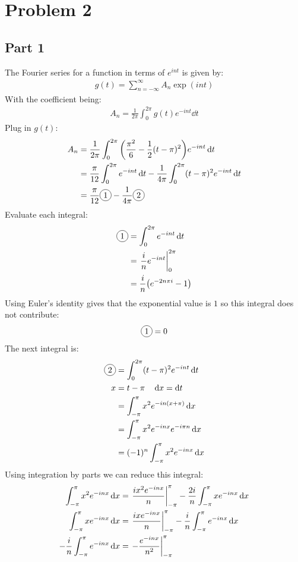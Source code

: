 \documentclass[12pt]{article}
\newcommand*\circled[1]{\tikz[baseline=(char.base)]{
            \node[shape=circle,draw,inner sep=2pt] (char) {#1};}}
\begin{document}
\section*{Problem 2}
\subsection*{Part 1}
The Fourier series for a function in terms of $e^{int}$ is given by:
\begin{align*}
  g(t)=\sum_{n=-\infty}^{\infty}A_n\exp(int)
\end{align*}
With the coefficient being:
\begin{align*}
  A_n=\frac{1}{2\pi}\int_0^{2\pi}g(t)e^{-int}\dd{t}
\end{align*}
Plug in $g(t)$:
\begin{align*}
  A_n&=\frac{1}{2\pi}\int_0^{2\pi}
  \qty(\frac{\pi^2}{6}-\frac12(t-\pi)^2)e^{-int}\dd{t}\\
  &=\frac\pi{12}\int_0^{2\pi}e^{-int}\dd{t}
  -\frac{1}{4\pi}\int_0^{2\pi}(t-\pi)^2e^{-int}\dd{t}\\
  &=\frac{\pi}{12}\circled{1}-\frac{1}{4\pi}\circled{2}
\end{align*}
Evaluate each integral:
\begin{align*}
  \circled{1}&=\int_0^{2\pi}e^{-int}\dd{t}\\
  &=\eval{\frac{i}{n}e^{-int}}_{0}^{2\pi}\\
  &=\frac{i}{n}\qty(e^{-2n\pi i}-1)
\end{align*}
Using Euler's identity gives that the exponential value is $1$ so this integral does not contribute:
\begin{align*}
  \circled{1}=0
\end{align*}
The next integral is:
\begin{align*}
  \circled{2}&=\int_0^{2\pi}(t-\pi)^2e^{-int}\dd{t}\\
  x&=t-\pi \quad \dd{x}=\dd{t}\\
  &=\int_{-\pi}^{\pi}x^2e^{-in(x+\pi)}\dd{x}\\
  &=\int_{-\pi}^\pi x^2e^{-inx}e^{-i\pi n}\dd{x}\\
  &=(-1)^n\int_{-\pi}^{\pi}x^2e^{-inx}\dd{x}
\end{align*}
Using integration by parts we can reduce this integral:
\begin{align*}
  \int_{-\pi}^{\pi}x^2e^{-inx}\dd{x}&=\eval{\frac{ix^2e^{-inx}}{n}}_{-\pi}^\pi
  -\frac{2i}{n}\int_{-\pi}^\pi xe^{-inx}\dd{x}\\
  \int_{-\pi}^\pi xe^{-inx}\dd{x}&=\eval{\frac{ixe^{-inx}}{n}}_{-\pi}^\pi
  -\frac{i}{n}\int_{-\pi}^\pi e^{-inx}\dd{x}\\
  -\frac{i}{n}\int_{-\pi}^\pi e^{-inx}\dd{x}&=
  \eval{-\frac{e^{-inx}}{n^2}}_{-\pi}^\pi
\end{align*}
\end{document}
